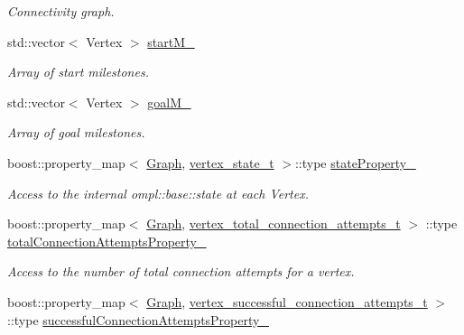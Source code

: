\begin{DoxyCompactItemize}
\begin{DoxyCompactList}\small\item\em \-Connectivity graph. \end{DoxyCompactList}\item 
\hypertarget{class_f_i_r_m_a68e900eda3c1969b678d6d4a97720e71}{std\-::vector$<$ \-Vertex $>$ \hyperlink{class_f_i_r_m_a68e900eda3c1969b678d6d4a97720e71}{start\-M\-\_\-}}\label{class_f_i_r_m_a68e900eda3c1969b678d6d4a97720e71}

\begin{DoxyCompactList}\small\item\em \-Array of start milestones. \end{DoxyCompactList}\item 
\hypertarget{class_f_i_r_m_a9583f5f480a2051d82c3f54efb6ab7ca}{std\-::vector$<$ \-Vertex $>$ \hyperlink{class_f_i_r_m_a9583f5f480a2051d82c3f54efb6ab7ca}{goal\-M\-\_\-}}\label{class_f_i_r_m_a9583f5f480a2051d82c3f54efb6ab7ca}

\begin{DoxyCompactList}\small\item\em \-Array of goal milestones. \end{DoxyCompactList}\item 
\hypertarget{class_f_i_r_m_aa4c014630cbac8a6eb961f22416aa8a4}{boost\-::property\-\_\-map$<$ \hyperlink{class_f_i_r_m_a687e9f4243b22c30ee1fa5da22a85053}{\-Graph}, \*
\hyperlink{struct_f_i_r_m_1_1vertex__state__t}{vertex\-\_\-state\-\_\-t} $>$\-::type \hyperlink{class_f_i_r_m_aa4c014630cbac8a6eb961f22416aa8a4}{state\-Property\-\_\-}}\label{class_f_i_r_m_aa4c014630cbac8a6eb961f22416aa8a4}

\begin{DoxyCompactList}\small\item\em \-Access to the internal ompl\-::base\-::state at each \-Vertex. \end{DoxyCompactList}\item 
\hypertarget{class_f_i_r_m_aef115c8ff78263ed3881059195fc0211}{boost\-::property\-\_\-map$<$ \hyperlink{class_f_i_r_m_a687e9f4243b22c30ee1fa5da22a85053}{\-Graph}, \*
\hyperlink{struct_f_i_r_m_1_1vertex__total__connection__attempts__t}{vertex\-\_\-total\-\_\-connection\-\_\-attempts\-\_\-t} $>$\*
\-::type \hyperlink{class_f_i_r_m_aef115c8ff78263ed3881059195fc0211}{total\-Connection\-Attempts\-Property\-\_\-}}\label{class_f_i_r_m_aef115c8ff78263ed3881059195fc0211}

\begin{DoxyCompactList}\small\item\em \-Access to the number of total connection attempts for a vertex. \end{DoxyCompactList}\item 
\hypertarget{class_f_i_r_m_ab351ce8f9c5c3592ff65b648a1b3822c}{boost\-::property\-\_\-map$<$ \hyperlink{class_f_i_r_m_a687e9f4243b22c30ee1fa5da22a85053}{\-Graph}, \*
\hyperlink{struct_f_i_r_m_1_1vertex__successful__connection__attempts__t}{vertex\-\_\-successful\-\_\-connection\-\_\-attempts\-\_\-t} $>$\*
\-::type \hyperlink{class_f_i_r_m_ab351ce8f9c5c3592ff65b648a1b3822c}{successful\-Connection\-Attempts\-Property\-\_\-}}\label{class_f_i_r_m_ab351ce8f9c5c3592ff65b648a1b3822c}


\end{DoxyCompactItemize}
